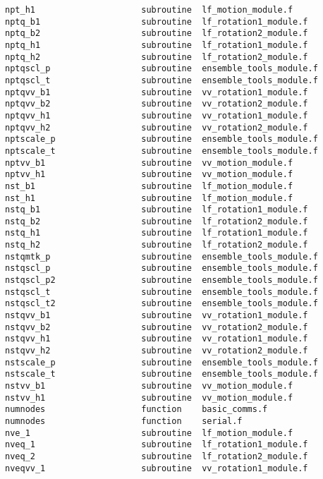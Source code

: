 \begin{verbatim}
npt_h1                     subroutine  lf_motion_module.f        
nptq_b1                    subroutine  lf_rotation1_module.f     
nptq_b2                    subroutine  lf_rotation2_module.f     
nptq_h1                    subroutine  lf_rotation1_module.f     
nptq_h2                    subroutine  lf_rotation2_module.f     
nptqscl_p                  subroutine  ensemble_tools_module.f   
nptqscl_t                  subroutine  ensemble_tools_module.f   
nptqvv_b1                  subroutine  vv_rotation1_module.f     
nptqvv_b2                  subroutine  vv_rotation2_module.f     
nptqvv_h1                  subroutine  vv_rotation1_module.f     
nptqvv_h2                  subroutine  vv_rotation2_module.f     
nptscale_p                 subroutine  ensemble_tools_module.f   
nptscale_t                 subroutine  ensemble_tools_module.f   
nptvv_b1                   subroutine  vv_motion_module.f        
nptvv_h1                   subroutine  vv_motion_module.f        
nst_b1                     subroutine  lf_motion_module.f        
nst_h1                     subroutine  lf_motion_module.f        
nstq_b1                    subroutine  lf_rotation1_module.f     
nstq_b2                    subroutine  lf_rotation2_module.f     
nstq_h1                    subroutine  lf_rotation1_module.f     
nstq_h2                    subroutine  lf_rotation2_module.f     
nstqmtk_p                  subroutine  ensemble_tools_module.f   
nstqscl_p                  subroutine  ensemble_tools_module.f   
nstqscl_p2                 subroutine  ensemble_tools_module.f   
nstqscl_t                  subroutine  ensemble_tools_module.f   
nstqscl_t2                 subroutine  ensemble_tools_module.f   
nstqvv_b1                  subroutine  vv_rotation1_module.f     
nstqvv_b2                  subroutine  vv_rotation2_module.f     
nstqvv_h1                  subroutine  vv_rotation1_module.f     
nstqvv_h2                  subroutine  vv_rotation2_module.f     
nstscale_p                 subroutine  ensemble_tools_module.f   
nstscale_t                 subroutine  ensemble_tools_module.f   
nstvv_b1                   subroutine  vv_motion_module.f        
nstvv_h1                   subroutine  vv_motion_module.f        
numnodes                   function    basic_comms.f             
numnodes                   function    serial.f                  
nve_1                      subroutine  lf_motion_module.f        
nveq_1                     subroutine  lf_rotation1_module.f     
nveq_2                     subroutine  lf_rotation2_module.f     
nveqvv_1                   subroutine  vv_rotation1_module.f     

\end{verbatim}
